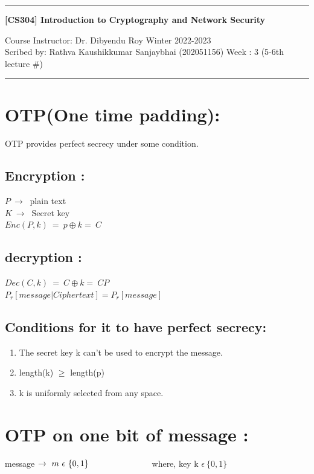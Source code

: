 \documentclass[11pt]{article}
\begin{document}

\noindent
\rule{\textwidth}{1pt}
\begin{center}
{\bf [CS304] Introduction to Cryptography and Network Security}
\end{center}
Course Instructor: Dr. Dibyendu Roy \hfill Winter 2022-2023\\
Scribed by: Rathva Kaushikkumar Sanjaybhai (202051156) \hfill Week : 3 (5-6th lecture \#)
\\
\rule{\textwidth}{1pt}

\section{OTP(One time padding):}
OTP provides perfect secrecy under some condition.

\subsection{Encryption :}
$P\ \rightarrow\ $ plain text\\
$K\ \rightarrow\ $ Secret key\\

$Enc(P,k)\ =\ p \oplus k =\ C$

\subsection{decryption :}

$Dec(C,k)\ =\ C \oplus k =\ CP$\\

$P_r[message | Cipher text] = P_r[message]$

\subsection{Conditions for it to have perfect secrecy:}
\begin{enumerate}
    \item The secret key k can't be used to encrypt the message.
    \item length(k) $\ge$ length(p)
    \item k is uniformly selected from any space.
\end{enumerate}

\section{OTP on one bit of message :}
message $\rightarrow\ m\ \epsilon\ \{0,1\}\hspace{2.5cm}$ where, key k $\epsilon\ \{0,1\}$ \\
\end{document}
